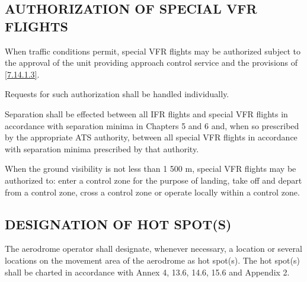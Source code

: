 \subsection[Authorization of special VFR flights]{AUTHORIZATION OF SPECIAL VFR FLIGHTS}

\begin{enumnoss}
    \item When traffic conditions permit, special VFR flights may be authorized subject to the approval of the unit providing approach control service and the provisions of \ref{7.14.1.3}.

    \begin{enumnoss}
        \item Requests for such authorization shall be handled individually.
        \item Separation shall be effected between all IFR flights and special VFR flights in accordance with separation minima in Chapters 5 and 6 and, when so prescribed by the appropriate ATS authority, between all special VFR flights in accordance with separation minima prescribed by that authority.
        \item \label{7.14.1.3} When the ground visibility is not less than 1 500 m, special VFR flights may be authorized to: enter a control zone for the purpose of landing, take off and depart from a control zone, cross a control zone or operate locally within a control zone.
    \end{enumnoss}

\end{enumnoss}


\subsection[Designation of hot spot(s)]{DESIGNATION OF HOT SPOT(S)}

The aerodrome operator shall designate, whenever necessary, a location or several locations on the movement area of the aerodrome as hot spot(s). The hot spot(s) shall be charted in accordance with Annex 4, 13.6, 14.6, 15.6 and Appendix 2.

\chapterend